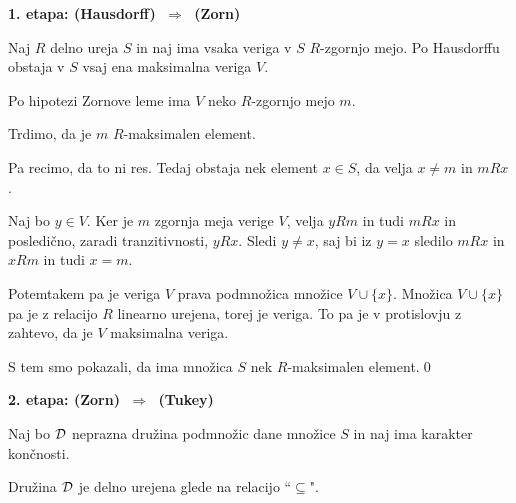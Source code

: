 \documentclass[11pt,paper=b5,footinclude,headinclude]{scrbook} %
\def\sledi {{~\Rightarrow~}}
\begin{document}
\bigskip
\textbf{1. etapa: (Hausdorff) $\sledi$ (Zorn)}

Naj $R$ delno ureja $S$ in naj ima vsaka veriga v $S$ $R$-zgornjo mejo.
Po Hausdorffu obstaja v $S$ vsaj ena maksimalna veriga $V$.

Po hipotezi Zornove leme ima $V$ neko $R$-zgornjo mejo $m$.

Trdimo, da je $m$ $R$-maksimalen element.

Pa recimo, da to ni res. Tedaj obstaja nek element $x\in S$, da velja $x\neq m$ in $mRx$.

Naj bo $y\in V$. Ker je $m$ zgornja meja verige $V$, velja $yRm$ in tudi $mRx$ in
posledično, zaradi tranzitivnosti, $yRx$. Sledi $y\neq x$, saj bi iz $y=x$ sledilo $mRx$ in $xRm$ in tudi $x = m$.

Potemtakem pa je veriga $V$ prava podmnožica množice $V\cup \{x\}$. Množica $V\cup \{x\}$ pa je z relacijo $R$ linearno urejena, torej je veriga. To pa je v protislovju z zahtevo, da je $V$ maksimalna veriga.

S tem smo pokazali, da ima množica $S$ nek $R$-maksimalen element.\qed

%
%
%
%
%
\bigskip
\textbf{2. etapa: (Zorn) $\sledi$ (Tukey)}

Naj bo ${\cal D}$ neprazna družina podmnožic dane množice $S$ in naj ima karakter končnosti.

Družina ${\cal D}$ je delno urejena glede na relacijo ``$\subseteq$".
\end{document}
